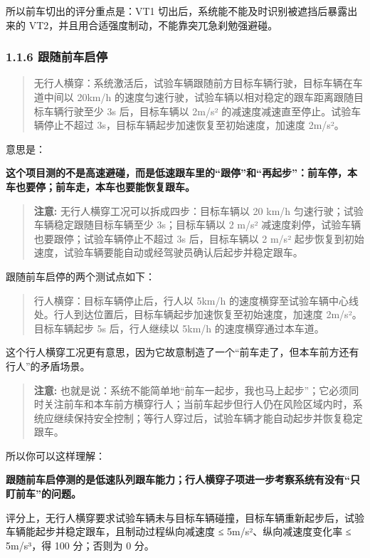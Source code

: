 所以前车切出的评分重点是：VT1 切出后，系统能不能及时识别被遮挡后暴露出来的 VT2，并且用合适强度制动，不能靠突兀急刹勉强避碰。

\subsubsection{1.1.6 跟随前车启停}

\begin{quote}
  无行人横穿：系统激活后，试验车辆跟随前方目标车辆行驶，目标车辆在车道中间以 20km/h 的速度匀速行驶，试验车辆以相对稳定的跟车距离跟随目标车辆行驶至少 3s 后，目标车辆以 2m/s² 的减速度减速直至停止。试验车辆停止不超过 3s，目标车辆起步加速恢复至初始速度，加速度 2m/s²。
\end{quote}

意思是：

\textbf{这个项目测的不是高速避碰，而是低速跟车里的“跟停”和“再起步”：前车停，本车也要停；前车走，本车也要能恢复跟车。}

\begin{quote}
  \textbf{注意:} 无行人横穿工况可以拆成四步：目标车辆以 20 km/h 匀速行驶；试验车辆稳定跟随目标车辆至少 3s；目标车辆以 2 m/s² 减速度刹停，试验车辆也要跟停；试验车辆停止不超过 3s 后，目标车辆以 2 m/s² 起步恢复到初始速度，试验车辆要能自动或经驾驶员确认后起步并稳定跟车。
\end{quote}

跟随前车启停的两个测试点如下：

\begin{quote}
  行人横穿：目标车辆停止后，行人以 5km/h 的速度横穿至试验车辆中心线处。行人到达位置后，目标车辆起步加速恢复至初始速度，加速度 2m/s²。目标车辆起步 5s 后，行人继续以 5km/h 的速度横穿通过本车道。
\end{quote}

这个行人横穿工况更有意思，因为它故意制造了一个“前车走了，但本车前方还有行人”的矛盾场景。

\begin{quote}
  \textbf{注意:} 也就是说：系统不能简单地“前车一起步，我也马上起步”；它必须同时关注前车和本车前方横穿行人；当前车起步但行人仍在风险区域内时，系统应继续保持安全控制；等行人穿过后，试验车辆才能自动起步并恢复稳定跟车。
\end{quote}

所以你可以这样理解：

\textbf{跟随前车启停测的是低速队列跟车能力；行人横穿子项进一步考察系统有没有“只盯前车”的问题。}

评分上，无行人横穿要求试验车辆未与目标车辆碰撞，目标车辆重新起步后，试验车辆能起步并稳定跟车，且制动过程纵向减速度 ≤ 5m/s²、纵向减速度变化率 ≤ 5m/s³，得 100 分；否则为 0 分。

